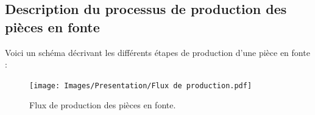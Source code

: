 \documentclass[12pt]{article}
\begin{document}
\newpage

\subsection{Description du processus de production des pièces en fonte}

Voici un schéma décrivant les différents étapes de production d'une pièce en fonte :


% 

\begin{figure}[H]
    \centering
    \begin{adjustbox}{width=1.3\textwidth,height=0.8\textheight,center}
        \texttt{[image: Images/Presentation/Flux de production.pdf]}
    \end{adjustbox}
    \caption{Flux de production des pièces en fonte.}
    \label{fig:flux-production}
\end{figure}
\end{document}

